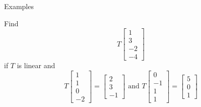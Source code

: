 \documentclass{beamer}
\begin{document}
\begin{frame}{Examples}
\begin{example}
	Find
	\begin{equation*}
	T \left[
	\begin{array}{c}
	1\\
	3\\
	-2\\
	-4
	\end{array}
	\right]
	\end{equation*}
	if $T$ is linear and
	\begin{equation*}
	T \left[
	\begin{array}{c}
	1\\
	1\\
	0\\
	-2
	\end{array}
	\right] = \left[
	\begin{array}{c}
	2\\
	3\\
	-1
	\end{array}
	\right]\text{ and } T \left[
	\begin{array}{c}
	0\\
	-1\\
	1\\
	1
	\end{array}
	\right] = \left[
	\begin{array}{c}
	5\\
	0\\
	1
	\end{array}
	\right]
	\end{equation*}
\end{example}
\end{frame}
\end{document}
